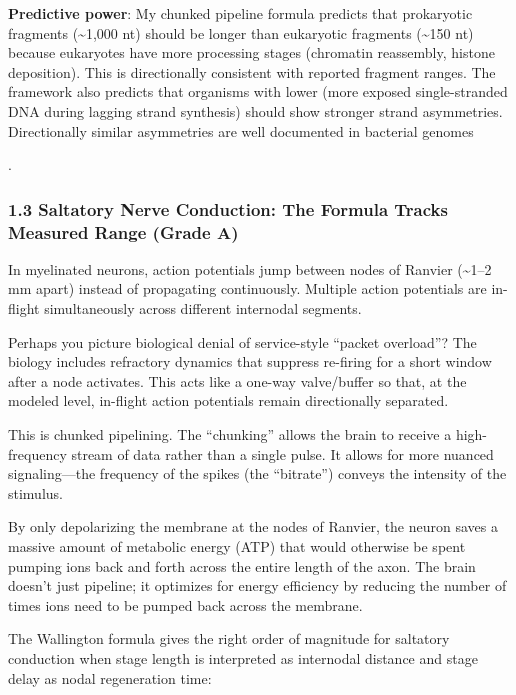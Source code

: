 \documentclass[
]{article}
\begin{document}
\textbf{Predictive power}: My chunked pipeline formula predicts that
prokaryotic fragments (\textasciitilde1,000 nt) should be longer than
eukaryotic fragments (\textasciitilde150 nt) because eukaryotes have
more processing stages (chromatin reassembly, histone deposition). This
is directionally consistent with reported fragment ranges. The framework
also predicts that organisms with lower (more exposed single-stranded
DNA during lagging strand synthesis) should show stronger strand
asymmetries. Directionally similar asymmetries are well documented in
bacterial genomes

.

\subsubsection{\texorpdfstring{\textbf{1.3 Saltatory Nerve Conduction:
The Formula Tracks Measured Range (Grade
A)}}{1.3 Saltatory Nerve Conduction: The Formula Tracks Measured Range (Grade A)}}\label{saltatory-nerve-conduction-the-formula-tracks-measured-range-grade-a}

In myelinated neurons, action potentials jump between nodes of Ranvier
(\textasciitilde1--2 mm apart) instead of propagating continuously.
Multiple action potentials are in-flight simultaneously across different
internodal segments.

Perhaps you picture biological denial of service-style ``packet
overload''? The biology includes refractory dynamics that suppress
re-firing for a short window after a node activates. This acts like a
one-way valve/buffer so that, at the modeled level, in-flight action
potentials remain directionally separated.

This is chunked pipelining. The ``chunking'' allows the brain to receive
a high-frequency stream of data rather than a single pulse. It allows
for more nuanced signaling---the frequency of the spikes (the
``bitrate'') conveys the intensity of the stimulus.

By only depolarizing the membrane at the nodes of Ranvier, the neuron
saves a massive amount of metabolic energy (ATP) that would otherwise be
spent pumping ions back and forth across the entire length of the axon.
The brain doesn't just pipeline; it optimizes for energy efficiency by
reducing the number of times ions need to be pumped back across the
membrane.

The Wallington formula gives the right order of magnitude for saltatory
conduction when stage length is interpreted as internodal distance and
stage delay as nodal regeneration time:
\end{document}
